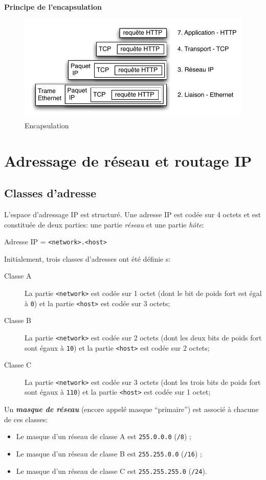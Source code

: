 \documentclass[11pt,english,french]{scrreprt}
\theoremstyle{remark}
\theoremstyle{definition}
\begin{document}
\textbf{Principe de l'encapsulation}
\begin{figure}[h!]
	\center
	\includegraphics[scale=.75]{graphes/IP/Encapsulation}
	\caption{Encapsulation}
\end{figure}

\section{Adressage de réseau et routage IP} %

\subsection{Classes d'adresse} %

L'espace d'adressage IP est structuré. Une adresse IP est codée sur 4 octets et est constituée de deux parties: une partie \emph{réseau} et une partie \emph{hôte}:

\qquad Adresse IP = \lstinline!<network>.<host>!

Initialement, trois classes d'adresses ont été définie s: \begin{description}
	\item[Classe A] La partie \lstinline!<network>! est codée sur 1 octet (dont le bit de poids fort est égal à \lstinline!0!) et la partie \lstinline!<host>! est codée sur 3 octets;
	\item[Classe B] La partie \lstinline!<network>! est codée sur 2 octets (dont les deux bits de poids fort sont égaux à \lstinline!10!) et la partie \lstinline!<host>! est codée sur 2 octets;
	\item[Classe C] La partie \lstinline!<network>! est codée sur 3 octets (dont les trois bits de poids fort sont égaux à \lstinline!110!) et la partie \lstinline!<host>! est codée sur 1 octet;
\end{description}

Un \emph{\textbf{masque de réseau}} (encore appelé masque “primaire”) est associé à chacune de ces classes:\begin{itemize}
	\item Le masque d'un réseau de classe A est \lstinline!255.0.0.0! (\lstinline!/8!) ;
	\item Le masque d'un réseau de classe B est \lstinline!255.255.0.0! (\lstinline!/16!) ;
	\item Le masque d'un réseau de classe C est \lstinline!255.255.255.0! (\lstinline!/24!).
\end{itemize}
\end{document}
